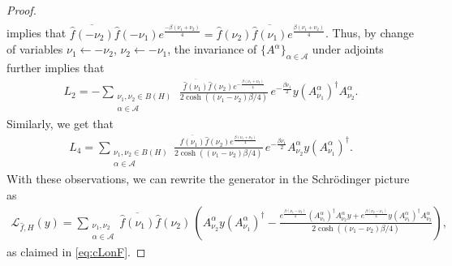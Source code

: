 \documentclass[11pt]{amsart}
\newcommand{\1}{\mathbbm{1}}
\theoremstyle{plain}
\theoremstyle{definition}
\theoremstyle{remark}
\numberwithin{equation}{section}
\begin{document}
\begin{proof}
\begin{align*}
\end{align*}
 implies that $\overline{\widehat{f}(-\nu_2)}\widehat{f}(-\nu_1)e^{\frac{-\beta(\nu_1+\nu_2)}{4}}=\widehat{f}(\nu_2)\overline{\widehat{f}(\nu_1)}e^{\frac{\beta(\nu_1+\nu_2)}{4}}$. Thus, by change of variables $\nu_1\leftarrow -\nu_2$, $\nu_2\leftarrow -\nu_1$, the invariance of $\{A^\alpha\}_{\alpha\in\mathcal{A}}$ under adjoints further implies that 
\begin{align*}
L_2=-\sum_{\substack{\nu_1,\nu_2\in B(H)\\\alpha\in\mathcal{A}}}\,\frac{\overline{\widehat{f}(\nu_1)}\widehat{f}(\nu_2)e^{-\frac{\beta(\nu_1+\nu_2)}{4}}}{2\cosh((\nu_1-\nu_2)\beta/4)}\,e^{-\frac{\beta\nu_1}{2}}y(A^\alpha_{\nu_1})^\dagger A^\alpha_{\nu_2}.
\end{align*}
Similarly, we get that 
\begin{align*}
L_4=\sum_{\substack{\nu_1,\nu_2\in B(H)\\\alpha\in\mathcal{A}}}\frac{\overline{\widehat{f}(\nu_1)}\widehat{f}(\nu_2)e^{\frac{\beta(\nu_1+\nu_2)}{4}}}{2\cosh((\nu_1-\nu_2)\beta/4)}\,e^{-\frac{\beta\nu_1}{2}}A^\alpha_{\nu_2} y(A^\alpha_{\nu_1})^\dagger.
\end{align*}
With these observations, we can rewrite the generator in the Schr\"{o}dinger picture as
\begin{align*}
\mathcal{L}_{\widehat{f},H}(y)=\sum_{\substack{\nu_1,\nu_2\\\alpha\in\mathcal{A}}}\overline{\widehat{f}(\nu_1)}\widehat{f}(\nu_2)\,\left(A^\alpha_{\nu_2} y(A^\alpha_{\nu_1})^\dagger-\frac{e^{\frac{\beta(\nu_1-\nu_2)}{4}}(A^\alpha_{\nu_1})^\dagger A^\alpha_{\nu_2}y+e^{\frac{\beta(\nu_2-\nu_1)}{4}}y(A^\alpha_{\nu_1})^\dagger A^\alpha_{\nu_2}}{2\cosh((\nu_1-\nu_2)\beta/4)}\right),
\end{align*}
as claimed in \eqref{eq:cLonF}. 




\end{proof}
\end{document}
